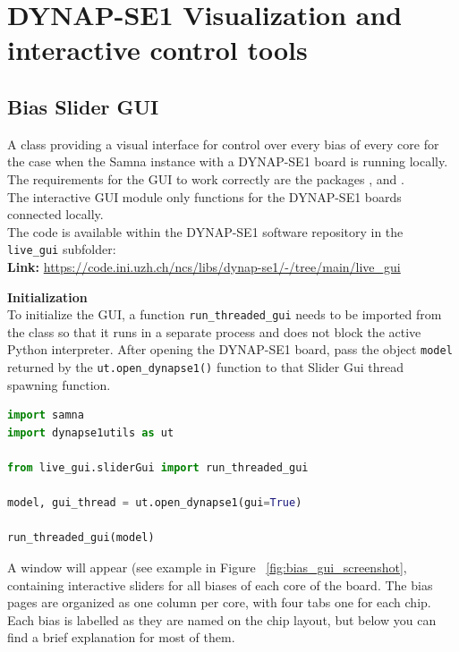  \chapter{DYNAP-SE1 Visualization and interactive control tools}
 \label{appendix:dynapse_gui}

 \section{Bias Slider GUI}

 A class providing a visual interface for control over every bias of every core for the case when the Samna instance with a DYNAP-SE1 board is running locally. The requirements for the GUI to work correctly are the packages ,  and .
\\
The interactive GUI module only functions for the DYNAP-SE1 boards connected locally.
\\
\noindent The code is available within the DYNAP-SE1 software repository in the \verb|live_gui| subfolder:\\

\textbf{Link:} \url{https://code.ini.uzh.ch/ncs/libs/dynap-se1/-/tree/main/live_gui}

\bigskip
\noindent\textbf{Initialization}\\

To initialize the GUI, a function \verb|run_threaded_gui| needs to be imported from the  class so that it runs in a separate process and does not block the active Python interpreter. After opening the DYNAP-SE1 board, pass the object \verb|model| returned by the \verb|ut.open_dynapse1()| function to that Slider Gui thread spawning function.

\begin{lstlisting}[language=Python, caption=Slider Gui initialization]
import samna
import dynapse1utils as ut

from live_gui.sliderGui import run_threaded_gui

model, gui_thread = ut.open_dynapse1(gui=True)

run_threaded_gui(model)

\end{lstlisting}

A window will appear (see example in Figure ~\ref{fig:bias_gui_screenshot}, containing interactive sliders for all biases of each core of the board. The bias pages are organized as one column per core, with four tabs one for each chip. Each bias is labelled as they are named on the chip layout, but below you can find a brief explanation for most of them.

